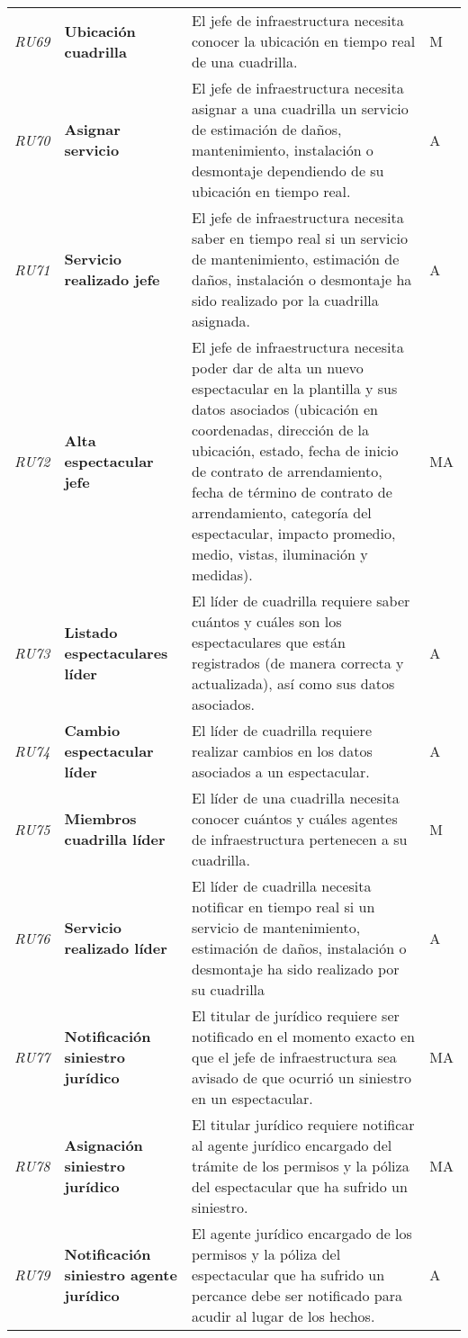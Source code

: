 \begin{longtable}[H]{m{1cm}m{3cm}m{10cm}m{1cm}}
\textit{RU69} & \textbf{Ubicación cuadrilla} & El jefe de infraestructura necesita conocer la ubicación en tiempo real de una cuadrilla. & M \tabularnewline
\textit{RU70} & \textbf{Asignar servicio} & El jefe de infraestructura necesita asignar a una cuadrilla un servicio de estimación de daños, mantenimiento, instalación o desmontaje dependiendo de su ubicación en tiempo real. & A\tabularnewline
\textit{RU71} & \textbf{Servicio realizado jefe} & El jefe de infraestructura necesita saber en tiempo real si un servicio de mantenimiento, estimación de daños, instalación o desmontaje ha sido realizado por la cuadrilla asignada. & A\tabularnewline
\textit{RU72} & \textbf{Alta espectacular jefe} & El jefe de infraestructura necesita poder dar de alta un nuevo espectacular en la plantilla y sus datos asociados (ubicación en coordenadas, dirección de la ubicación, estado, fecha de inicio de contrato de arrendamiento, fecha de término de contrato de arrendamiento, categoría del espectacular, impacto promedio, medio, vistas, iluminación y medidas). & MA\tabularnewline
\textit{RU73} & \textbf{Listado espectaculares líder} & El líder de cuadrilla requiere saber cuántos y cuáles son los espectaculares que están registrados (de manera correcta y actualizada), así como sus datos asociados. & A\tabularnewline
\textit{RU74} & \textbf{Cambio espectacular líder} & El líder de cuadrilla requiere realizar cambios en los datos asociados a un espectacular. & A\tabularnewline
\textit{RU75} & \textbf{Miembros cuadrilla líder} & El líder de una cuadrilla necesita conocer cuántos y cuáles agentes de infraestructura pertenecen a su cuadrilla. & M\tabularnewline
\textit{RU76} & \textbf{Servicio realizado líder} & El líder de cuadrilla necesita notificar en tiempo real si un servicio de mantenimiento, estimación de daños, instalación o desmontaje ha sido realizado por su cuadrilla & A\tabularnewline
\textit{RU77} & \textbf{Notificación siniestro jurídico} & El titular de jurídico requiere ser notificado en el momento exacto en que el jefe de infraestructura sea avisado de que ocurrió un siniestro en un espectacular. & MA\tabularnewline
\textit{RU78} & \textbf{Asignación siniestro jurídico} & El titular jurídico requiere notificar al agente jurídico encargado del trámite de los permisos y la póliza del espectacular que ha sufrido un siniestro. & MA\tabularnewline
\textit{RU79} & \textbf{Notificación siniestro agente jurídico} & El agente jurídico encargado de los permisos y la póliza del espectacular que ha sufrido un percance debe ser notificado para acudir al lugar de los hechos. & A\tabularnewline

\end{longtable}
